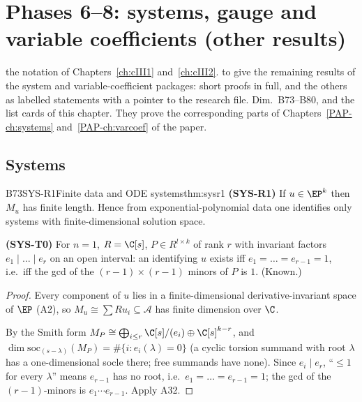 \chapter[Systems, gauge, variable coefficients]{Phases 6--8: systems, gauge and variable coefficients (other results)}\label{ch:cIV1}
\chapterbrief
{the notation of Chapters~\ref{ch:cIII1} and~\ref{ch:cIII2}.}
{to give the remaining results of the system and variable-coefficient packages: short proofs in full, and the others as labelled statements with a pointer to the research file.}
{Dim.~B73--B80, and the list cards of this chapter. They prove the corresponding parts of Chapters~\ref{PAP-ch:systems} and~\ref{PAP-ch:varcoef} of the paper.}

\section{Systems}

\begin{dimcard}{B73}{SYS-R1}{Finite data and ODE systems}{\proved}{thm:sysr1}
\textbf{(SYS-R1)} If $u\in\EP^k$ then $M_u$ has finite length. Hence from exponential-polynomial data one identifies only systems with finite-dimensional solution space.

\textbf{(SYS-T0)} For $n=1$, $R=\C[s]$, $P\in R^{l\times k}$ of rank $r$ with invariant factors $e_1\mid\dots\mid e_r$ on an open interval: an identifying $u$ exists iff $e_1=\dots=e_{r-1}=1$, i.e.\ iff the gcd of the $(r-1)\times(r-1)$ minors of $P$ is $1$. (Known.)
\end{dimcard}

\begin{proof}
Every component of $u$ lies in a finite-dimensional derivative-invariant space of $\EP$ (A2), so $M_u\cong\sum Ru_i\subseteq\mathcal A$ has finite dimension over $\C$.

By the Smith form $M_P\cong\bigoplus_{i\le r}\C[s]/(e_i)\oplus\C[s]^{k-r}$, and $\dim\mathrm{soc}_{(s-\lambda)}(M_P)=\#\{i:e_i(\lambda)=0\}$ (a cyclic torsion summand with root $\lambda$ has a one-dimensional socle there; free summands have none). Since $e_i\mid e_r$, ``$\le1$ for every $\lambda$'' means $e_{r-1}$ has no root, i.e.\ $e_1=\dots=e_{r-1}=1$; the gcd of the $(r-1)$-minors is $e_1\cdots e_{r-1}$. Apply A32.

\end{proof}

